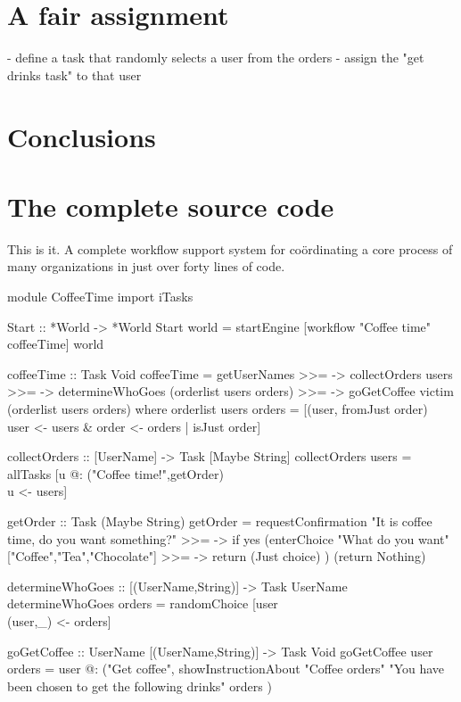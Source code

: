 \documentclass[a4paper,11pt]{article}
\begin{document}
\section{A fair assignment}
- define a task that randomly selects a user from the orders
- assign the "get drinks task" to that user
\section{Conclusions}

\appendix
\newpage
\section{The complete source code}
This is it. A complete workflow support system for co\"ordinating a core process of many organizations in just over forty lines of code.
\begin{CleanCodeN}
module CoffeeTime
import iTasks

Start :: *World -> *World
Start world = startEngine [workflow "Coffee time" coffeeTime] world

coffeeTime :: Task Void
coffeeTime
    =   getUserNames
    >>= \users ->
        collectOrders users 
    >>= \orders ->
        determineWhoGoes (orderlist users orders)
    >>= \victim ->
        goGetCoffee victim (orderlist users orders)
where
  orderlist users orders
    = [(user, fromJust order) \\ user <- users & order <- orders | isJust order]

collectOrders :: [UserName] -> Task [Maybe String] 
collectOrders users = allTasks [u @: ("Coffee time!",getOrder) \\ u <- users]

getOrder :: Task (Maybe String)
getOrder
    =   requestConfirmation "It is coffee time, do you want something?"
    >>= \yes -> if yes
        (enterChoice "What do you want" ["Coffee","Tea","Chocolate"]
         >>= \choice -> return (Just choice)
        )
        (return Nothing)

determineWhoGoes :: [(UserName,String)] -> Task UserName
determineWhoGoes orders = randomChoice [user \\ (user,_) <- orders]

goGetCoffee :: UserName [(UserName,String)] -> Task Void
goGetCoffee user orders
    = user @:
     ("Get coffee", showInstructionAbout
                        "Coffee orders" 
                        "You have been chosen to get the following drinks" 
                        orders
     )

\end{CleanCodeN}
\end{document}

